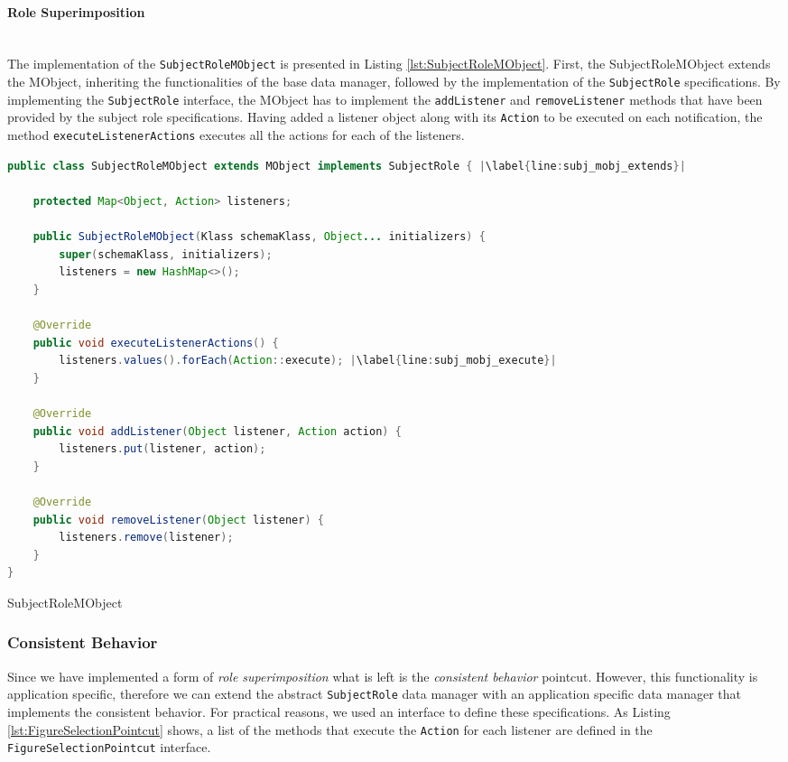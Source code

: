 \paragraph{Role Superimposition}\mbox{}\\
The implementation of the \texttt{SubjectRoleMObject} is presented in Listing \ref{lst:SubjectRoleMObject}.
First, the SubjectRoleMObject extends the MObject, inheriting the functionalities of the base data manager, followed by the implementation of the \texttt{SubjectRole} specifications.
By implementing the \texttt{SubjectRole} interface, the MObject has to implement the \texttt{addListener} and \texttt{removeListener} methods that have been provided by the subject role specifications.
Having added a listener object along with its \texttt{Action} to be executed on each notification, the method \texttt{executeListenerActions} executes all the actions for each of the listeners.

\begin{sourcecode} [H]
	\begin{lstlisting}[language=Java, escapechar=|]
public class SubjectRoleMObject extends MObject implements SubjectRole { |\label{line:subj_mobj_extends}|

	protected Map<Object, Action> listeners;

	public SubjectRoleMObject(Klass schemaKlass, Object... initializers) {
		super(schemaKlass, initializers);
		listeners = new HashMap<>();
	}

	@Override
	public void executeListenerActions() {
		listeners.values().forEach(Action::execute); |\label{line:subj_mobj_execute}|
	}

	@Override
	public void addListener(Object listener, Action action) {
		listeners.put(listener, action);
	}

	@Override
	public void removeListener(Object listener) {
		listeners.remove(listener);
	}
}
	\end{lstlisting}
	\caption{SubjectRoleMObject}
	\label{lst:SubjectRoleMObject}
\end{sourcecode}

\subsubsection{Consistent Behavior}
Since we have implemented a form of \textit{role superimposition} what is left is the \textit{consistent behavior} pointcut.
However, this functionality is application specific, therefore we can extend the abstract \texttt{SubjectRole} data manager with an application specific data manager that implements the consistent behavior.
For practical reasons, we used an interface to define these specifications.
As Listing \ref{lst:FigureSelectionPointcut} shows, a list of the methods that execute the \texttt{Action} for each listener are defined in the \texttt{FigureSelectionPointcut} interface. 

